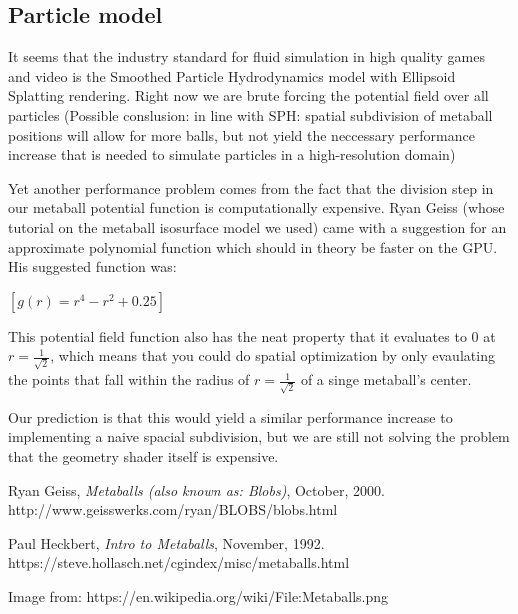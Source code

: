 \documentclass{article}
\begin{document}
\begin{multicols}{2}
        \subsection{Particle model}
    	It seems that the industry standard for fluid simulation in high quality games and video is the Smoothed Particle Hydrodynamics model with Ellipsoid Splatting rendering.
        Right now we are brute forcing the potential field over all particles
        (Possible conslusion: in line with SPH: spatial subdivision of metaball positions will allow for more balls, but not yield the neccessary performance increase that is needed to simulate particles in a high-resolution domain)

        Yet another performance problem comes from the fact that the division step in our metaball potential function is computationally expensive.
        Ryan Geiss (whose tutorial on the metaball isosurface model we used) came with a suggestion for an approximate polynomial function which should in theory be faster on the GPU. His suggested function was:

        $[g(r) = r^4 - r^2 + 0.25]$

        This potential field function also has the neat property that it evaluates to 0 at $r=\frac{1}{\sqrt{2}}$, which means that you could do spatial optimization by only evaulating the points that fall within the radius of $r=\frac{1}{\sqrt{2}}$ of a singe metaball's center.

        \cite{geiss00}

        Our prediction is that this would yield a similar performance increase to implementing a naive spacial subdivision, but we are still not solving the problem that the geometry shader itself is expensive.

	\end{multicols}

\begin{thebibliography}{9}

  Ryan Geiss,
  \textit{Metaballs (also known as: Blobs)},
  October,
  2000.
  \\
  http://www.geisswerks.com/ryan/BLOBS/blobs.html

  Paul Heckbert,
  \textit{Intro to Metaballs},
  November,
  1992.
  \\
  https://steve.hollasch.net/cgindex/misc/metaballs.html

  Image from: https://en.wikipedia.org/wiki/File:Metaballs.png

\end{thebibliography}
\end{document}

